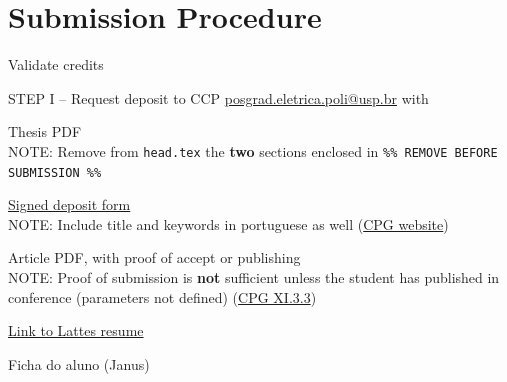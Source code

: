\documentclass[normalnum]{politex}
\newcommand{\cmark}{\ding{51}}%
\newcommand{\xmark}{\ding{55}}%
\newcommand{\done}{\rlap{$\square$}{\raisebox{2pt}{\large\hspace{1pt}\cmark}}%
\hspace{-2.5pt}}
\newcommand{\wontfix}{\rlap{$\square$}{\large\hspace{1pt}\xmark}}
\begin{document}
\section*{Submission Procedure}
\begin{todolist}%

\item[\done] Validate credits

\item[\done] STEP I -- Request deposit to CCP \url{posgrad.eletrica.poli@usp.br} with
\begin{todolist}
  \item[\done] Thesis PDF
  \\NOTE: Remove from \texttt{head.tex} the \textbf{two} sections enclosed in \texttt{\%\% REMOVE BEFORE SUBMISSION \%\%}
  \item[\done] \href{https://ppgee.poli.usp.br/wp-content/uploads/sites/92/2023/12/Formulario-de-deposito-revisado-10.10.2023-PPGEE-Atila.doc}{Signed deposit form}
  \\NOTE: Include title and keywords in portuguese as well (\href{https://www.poli.usp.br/ensino/posgraduacao/atendimento-pos-graduacao/deposito-de-dissertacao-ou-tese/}{CPG website})
  \item[\done] Article PDF, with proof of accept or publishing
  \\NOTE: Proof of submission is \textbf{not} sufficient unless the student has published in conference (parameters not defined) (\href{https://leginf.usp.br/?resolucao=resolucao-copgr-no-7658-de-20-de-maio-de-2019#:~:text=XI.3.3}{CPG XI.3.3})
  \item[\done] \href{https://lattes.cnpq.br/5021331797153494}{Link to Lattes resume}
  \item[\done] Ficha do aluno (Janus)
\end{todolist}


\end{todolist}
\end{document}
